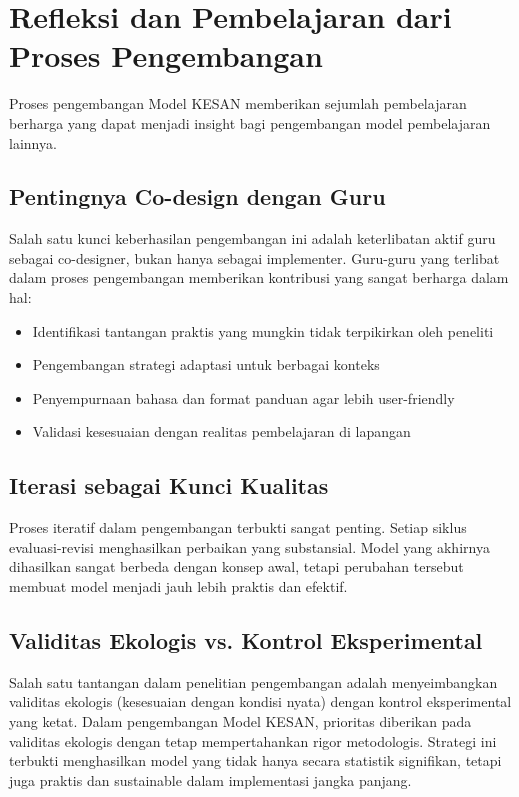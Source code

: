 \documentclass[12pt,a4paper,oneside]{book}
\begin{document}
\section{Refleksi dan Pembelajaran dari Proses Pengembangan}

Proses pengembangan Model KESAN memberikan sejumlah pembelajaran berharga yang dapat menjadi insight bagi pengembangan model pembelajaran lainnya.

\subsection{Pentingnya Co-design dengan Guru}

Salah satu kunci keberhasilan pengembangan ini adalah keterlibatan aktif guru sebagai co-designer, bukan hanya sebagai implementer. Guru-guru yang terlibat dalam proses pengembangan memberikan kontribusi yang sangat berharga dalam hal:
\begin{itemize}
\item Identifikasi tantangan praktis yang mungkin tidak terpikirkan oleh peneliti
\item Pengembangan strategi adaptasi untuk berbagai konteks
\item Penyempurnaan bahasa dan format panduan agar lebih user-friendly
\item Validasi kesesuaian dengan realitas pembelajaran di lapangan
\end{itemize}

\subsection{Iterasi sebagai Kunci Kualitas}

Proses iteratif dalam pengembangan terbukti sangat penting. Setiap siklus evaluasi-revisi menghasilkan perbaikan yang substansial. Model yang akhirnya dihasilkan sangat berbeda dengan konsep awal, tetapi perubahan tersebut membuat model menjadi jauh lebih praktis dan efektif.

\subsection{Validitas Ekologis vs. Kontrol Eksperimental}

Salah satu tantangan dalam penelitian pengembangan adalah menyeimbangkan validitas ekologis (kesesuaian dengan kondisi nyata) dengan kontrol eksperimental yang ketat. Dalam pengembangan Model KESAN, prioritas diberikan pada validitas ekologis dengan tetap mempertahankan rigor metodologis. Strategi ini terbukti menghasilkan model yang tidak hanya secara statistik signifikan, tetapi juga praktis dan sustainable dalam implementasi jangka panjang.
\end{document}
